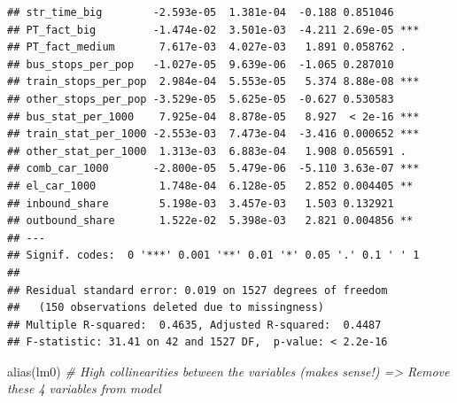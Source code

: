 \documentclass[
]{article}
\newenvironment{Shaded}{\begin{snugshade}}{\end{snugshade}}
\newcommand{\CommentTok}[1]{\textcolor[rgb]{0.56,0.35,0.01}{\textit{#1}}}
\newcommand{\FunctionTok}[1]{\textcolor[rgb]{0.00,0.00,0.00}{#1}}
\newcommand{\NormalTok}[1]{#1}
\begin{document}
\begin{verbatim}
## str_time_big        -2.593e-05  1.381e-04  -0.188 0.851046    
## PT_fact_big         -1.474e-02  3.501e-03  -4.211 2.69e-05 ***
## PT_fact_medium       7.617e-03  4.027e-03   1.891 0.058762 .  
## bus_stops_per_pop   -1.027e-05  9.639e-06  -1.065 0.287010    
## train_stops_per_pop  2.984e-04  5.553e-05   5.374 8.88e-08 ***
## other_stops_per_pop -3.529e-05  5.625e-05  -0.627 0.530583    
## bus_stat_per_1000    7.925e-04  8.878e-05   8.927  < 2e-16 ***
## train_stat_per_1000 -2.553e-03  7.473e-04  -3.416 0.000652 ***
## other_stat_per_1000  1.313e-03  6.883e-04   1.908 0.056591 .  
## comb_car_1000       -2.800e-05  5.479e-06  -5.110 3.63e-07 ***
## el_car_1000          1.748e-04  6.128e-05   2.852 0.004405 ** 
## inbound_share        5.198e-03  3.457e-03   1.503 0.132921    
## outbound_share       1.522e-02  5.398e-03   2.821 0.004856 ** 
## ---
## Signif. codes:  0 '***' 0.001 '**' 0.01 '*' 0.05 '.' 0.1 ' ' 1
## 
## Residual standard error: 0.019 on 1527 degrees of freedom
##   (150 observations deleted due to missingness)
## Multiple R-squared:  0.4635, Adjusted R-squared:  0.4487 
## F-statistic: 31.41 on 42 and 1527 DF,  p-value: < 2.2e-16
\end{verbatim}

\begin{Shaded}
\begin{Highlighting}[]
\FunctionTok{alias}\NormalTok{(lm0) }\CommentTok{\# High collinearities between the variables (makes sense!) =\textgreater{} Remove these 4 variables from model}
\end{Highlighting}
\end{Shaded}
\end{document}
